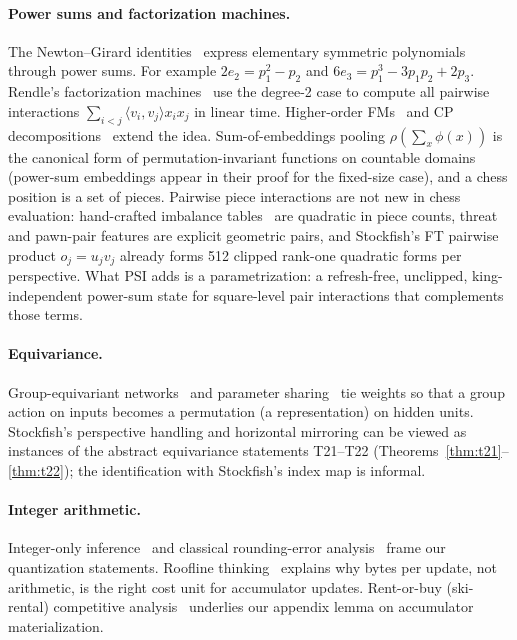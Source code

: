 \documentclass[10pt]{article}
\theoremstyle{plain}
\theoremstyle{definition}
\begin{document}
\paragraph{Power sums and factorization machines.}
The Newton--Girard identities~\cite{macdonald1995} express elementary symmetric polynomials through power sums.
For example $2e_2=p_1^2-p_2$ and $6e_3=p_1^3-3p_1p_2+2p_3$.
Rendle's factorization machines~\cite{rendle2010} use the degree-2 case to compute all pairwise interactions $\sum_{i<j}\langle v_i,v_j\rangle x_ix_j$ in linear time.
Higher-order FMs~\cite{blondel2016} and CP decompositions~\cite{kolda2009} extend the idea.
Sum-of-embeddings pooling $\rho(\sum_x\phi(x))$ is the canonical form of permutation-invariant functions on countable domains~\cite{zaheer2017} (power-sum embeddings appear in their proof for the fixed-size case), and a chess position is a set of pieces.
Pairwise piece interactions are not new in chess evaluation: hand-crafted imbalance tables~\cite{kaufman1999,sf11} are quadratic in piece counts, threat and pawn-pair features are explicit geometric pairs, and Stockfish's FT pairwise product $o_j=u_jv_j$ already forms 512 clipped rank-one quadratic forms per perspective.
What PSI adds is a parametrization: a refresh-free, unclipped, king-independent power-sum state for square-level pair interactions that complements those terms.

\paragraph{Equivariance.}
Group-equivariant networks~\cite{cohen2016} and parameter sharing~\cite{ravanbakhsh2017} tie weights so that a group action on inputs becomes a permutation (a representation) on hidden units.
Stockfish's perspective handling and horizontal mirroring can be viewed as instances of the abstract equivariance statements T21--T22 (Theorems~\ref{thm:t21}--\ref{thm:t22}); the identification with Stockfish's index map is informal.

\paragraph{Integer arithmetic.}
Integer-only inference~\cite{jacob2018} and classical rounding-error analysis~\cite{higham2002} frame our quantization statements.
Roofline thinking~\cite{williams2009} explains why bytes per update, not arithmetic, is the right cost unit for accumulator updates.
Rent-or-buy (ski-rental) competitive analysis~\cite{karlin1988,borodin1998} underlies our appendix lemma on accumulator materialization.
\end{document}
